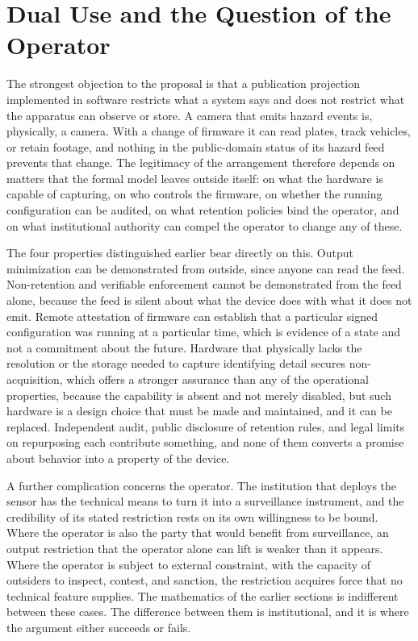 \documentclass[11pt]{article}
\theoremstyle{definition}
\begin{document}
\section{Dual Use and the Question of the Operator}

The strongest objection to the proposal is that a publication projection implemented in software restricts what a system says and does not restrict what the apparatus can observe or store. A camera that emits hazard events is, physically, a camera. With a change of firmware it can read plates, track vehicles, or retain footage, and nothing in the public-domain status of its hazard feed prevents that change. The legitimacy of the arrangement therefore depends on matters that the formal model leaves outside itself: on what the hardware is capable of capturing, on who controls the firmware, on whether the running configuration can be audited, on what retention policies bind the operator, and on what institutional authority can compel the operator to change any of these.

The four properties distinguished earlier bear directly on this. Output minimization can be demonstrated from outside, since anyone can read the feed. Non-retention and verifiable enforcement cannot be demonstrated from the feed alone, because the feed is silent about what the device does with what it does not emit. Remote attestation of firmware can establish that a particular signed configuration was running at a particular time, which is evidence of a state and not a commitment about the future. Hardware that physically lacks the resolution or the storage needed to capture identifying detail secures non-acquisition, which offers a stronger assurance than any of the operational properties, because the capability is absent and not merely disabled, but such hardware is a design choice that must be made and maintained, and it can be replaced. Independent audit, public disclosure of retention rules, and legal limits on repurposing each contribute something, and none of them converts a promise about behavior into a property of the device.

A further complication concerns the operator. The institution that deploys the sensor has the technical means to turn it into a surveillance instrument, and the credibility of its stated restriction rests on its own willingness to be bound. Where the operator is also the party that would benefit from surveillance, an output restriction that the operator alone can lift is weaker than it appears. Where the operator is subject to external constraint, with the capacity of outsiders to inspect, contest, and sanction, the restriction acquires force that no technical feature supplies. The mathematics of the earlier sections is indifferent between these cases. The difference between them is institutional, and it is where the argument either succeeds or fails.
\end{document}
